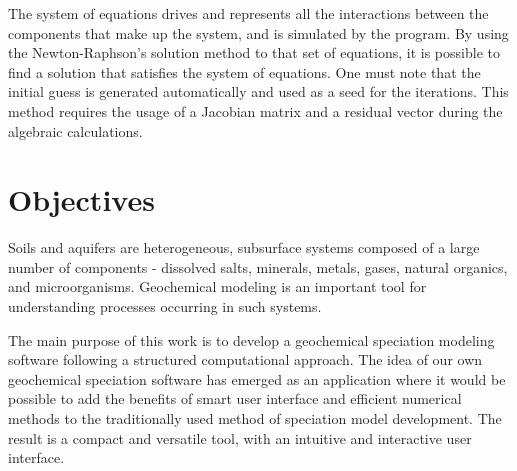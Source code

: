 
The system of equations drives and represents all the interactions between the components that make up the system, and is simulated by the program. By using the Newton-Raphson's solution method to that set of equations, it is possible to find a solution that satisfies the system of equations.  One must note that the initial guess is generated automatically and used as a seed for the iterations. This method requires the usage of a Jacobian matrix and a residual vector during the algebraic calculations. 



\section{Objectives}


Soils and aquifers are heterogeneous, subsurface systems composed of a large number of components - dissolved salts, minerals, metals, gases, natural organics, and microorganisms. Geochemical modeling is an important tool for understanding processes occurring in such systems. 

The main purpose of this work is to develop a geochemical speciation modeling software following a structured computational approach. The idea of our own geochemical speciation software has emerged as an application where it would be possible to add the benefits of smart user interface and efficient numerical methods to the traditionally used method of speciation model development. The result is a compact and versatile tool, with an intuitive and interactive user interface.

